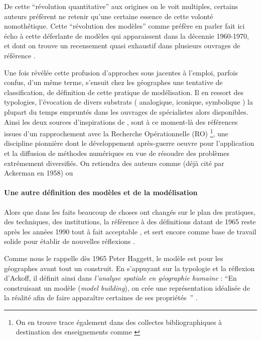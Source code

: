 De cette \enquote{révolution quantitative} aux origines on le voit multiples, certains auteurs préfèrent ne retenir qu'une certaine essence de cette volonté nomothétique. Cette \enquote{révolution des modèles} comme préfère en parler \textcite{Wilson1970, Varenne2014} fait ici écho à cette déferlante de modèles qui apparaissent dans la décennie 1960-1970, et dont on trouve un recensement quasi exhaustif dans plusieurs ouvrages de référence \autocite{Haggett1965,Chorley1967}.

Une fois révélée cette profusion d'approches sous jacentes à l'emploi, parfois confus, d'un même terme, s'ensuit chez les géographes une tentative de classification, de définition de cette pratique de modélisation. Il en ressort des typologies, l'évocation de divers substrats ( analogique, iconique, symbolique ) la plupart du temps empruntés dans les ouvrages de spécialistes alors disponibles. Ainsi les deux sources d'inspirations de \textcite[106]{Berry1963}, \textcite{Haggett1965} sont à ce moment-là des références issues d'un rapprochement avec la Recherche Opérationnelle (RO) \footnote{On en trouve trace également dans des collectes bibliographiques à destination des enseignements comme \autocite{Greer1972}}, une discipline pionnière dont le développement après-guerre oeuvre pour l'application et la diffusion de méthodes numériques en vue de résoudre des problèmes extrémement diversifiés. On retiendra des auteurs comme \textcite{Ackoff1962} (déjà cité par Ackerman en 1958) ou \textcite{Kemeny1962}

\paragraph{Une autre définition des modèles et de la modélisation}
\label{p:autre_def_modele}

Alors que dans les faits beaucoup de choses ont changés sur le plan des pratiques, des techniques, des institutions, la référence à des définitions datant de 1965 reste après les années 1990 tout à fait acceptable \autocites{Dastes2001b, Antony2013}[295]{Bailly1995}, et sert encore comme base de travail solide pour établir de nouvelles réflexions \autocite{Brunet2000}. 

Comme nous le rappelle dès 1965 Peter Haggett, le modèle est pour les géographes avant tout un construit. En s'appuyant sur la typologie et la réflexion d'Ackoff, il définit ainsi dans \textit{l'analyse spatiale en géographie humaine} : \enquote{En construisant un modèle (\textit{model building}), on crée une représentation idéalisée de la réalité afin de faire apparaître certaines de ses propriétés } \autocite[30]{Haggett1965}. 

